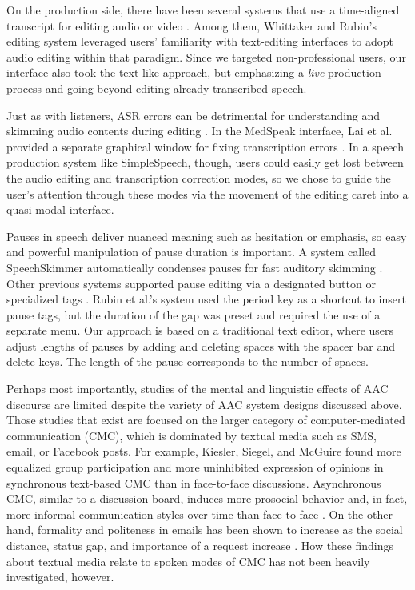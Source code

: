 On the production side, there have been several systems that use a time-aligned transcript for editing audio \cite{rubin,whittaker_semantic,yoon} or video \cite{Berthouzoz:2012,casares}. 
Among them, Whittaker and Rubin's editing system leveraged users' familiarity with text-editing interfaces to adopt audio editing within that paradigm. 
Since we targeted non-professional users, our interface also took the text-like approach, but emphasizing a \emph{live} production process and going beyond editing already-transcribed speech. 

Just as with listeners, ASR errors can be detrimental for understanding and skimming audio contents during editing \cite{halverson1999beauty}. 
In the MedSpeak interface, Lai et al. provided a separate graphical window for fixing transcription errors \cite{Lai:1997}. 
In a speech production system like SimpleSpeech, though, users could easily get lost between the audio editing and transcription correction modes, so we chose to guide the user's attention through these modes via the movement of the editing caret into a quasi-modal interface.

Pauses in speech deliver nuanced meaning such as hesitation or emphasis, so easy and powerful manipulation of pause duration is important. 
A system called SpeechSkimmer automatically condenses pauses for fast auditory skimming \cite{arons:1993}. 
Other previous systems supported pause editing via a designated button \cite{Berthouzoz:2012} or specialized tags \cite{rubin}. 
Rubin et al.'s system used the period key as a shortcut to insert pause tags, but the duration of the gap was preset and required the use of a separate menu. 
Our approach is based on a traditional text editor, where users adjust lengths of pauses by adding and deleting spaces with the spacer bar and delete keys. The length of the pause corresponds to the number of spaces.

Perhaps most importantly, studies of the mental and linguistic effects of AAC discourse are limited despite the variety of AAC system designs discussed above.
Those studies that exist are focused on the larger category of computer-mediated communication (CMC), which is dominated by textual media such as SMS, email, or Facebook posts.
For example, Kiesler, Siegel, and McGuire \cite{kiesler} found more equalized group participation and more uninhibited expression of opinions in synchronous text-based CMC than in face-to-face discussions.
Asynchronous CMC, similar to a discussion board, induces more prosocial behavior and, in fact, more informal communication styles over time than face-to-face \cite{walther}.
On the other hand, formality and politeness in emails has been shown to increase as the social distance, status gap, and importance of a request increase \cite{cho}.
How these findings about textual media relate to spoken modes of CMC has not been heavily investigated, however.
